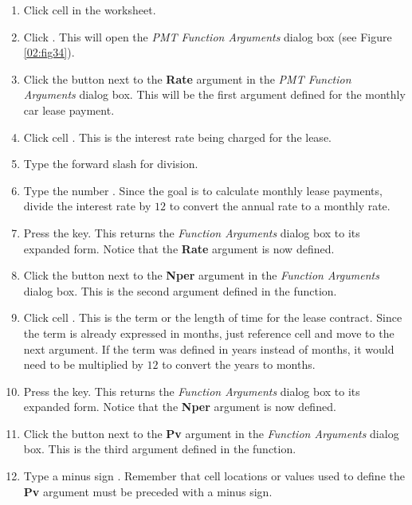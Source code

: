 \begin{enumbox}
	\begin{enumerate}
		\item Click cell  in the  worksheet.
		\item Click . This will open the \textit{PMT Function Arguments} dialog box (see Figure \ref{02:fig34}).
		\item Click the  button next to the \textbf{Rate} argument in the \textit{PMT Function Arguments} dialog box. This will be the first argument defined for the monthly car lease payment.
		\item Click cell . This is the interest rate being charged for the lease.
		\item Type the forward slash \fmtTyping{/} for division.
		\item Type the number . Since the goal is to calculate monthly lease payments, divide the interest rate by $ 12 $ to convert the annual rate to a monthly rate.
		\item Press the  key. This returns the \textit{Function Arguments} dialog box to its expanded form. Notice that the \textbf{Rate} argument is now defined.
		\item Click the  button next to the \textbf{Nper} argument in the \textit{Function Arguments} dialog box. This is the second argument defined in the function.
		\item Click cell . This is the term or the length of time for the lease contract. Since the term is already expressed in months, just reference cell  and move to the next argument. If the term was defined in years instead of months, it would need to be multiplied by $ 12 $ to convert the years to months.
		\item Press the  key. This returns the \textit{Function Arguments} dialog box to its expanded form. Notice that the \textbf{Nper} argument is now defined.
		\item Click the  button next to the \textbf{Pv} argument in the \textit{Function Arguments} dialog box. This is the third argument defined in the function.
		\item Type a minus sign \fmtTyping{-}. Remember that cell locations or values used to define the \textbf{Pv} argument must be preceded with a minus sign.

\end{enumerate}
\end{enumbox}
